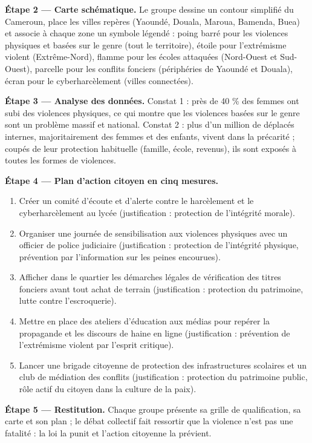 \documentclass[11pt]{article}
\begin{document}
\begin{exoresolu}
\textbf{Étape 2 — Carte schématique.} Le groupe dessine un contour simplifié du Cameroun, place les villes repères (Yaoundé, Douala, Maroua, Bamenda, Buea) et associe à chaque zone un symbole légendé : poing barré pour les violences physiques et basées sur le genre (tout le territoire), étoile pour l'extrémisme violent (Extrême-Nord), flamme pour les écoles attaquées (Nord-Ouest et Sud-Ouest), parcelle pour les conflits fonciers (périphéries de Yaoundé et Douala), écran pour le cyberharcèlement (villes connectées).\par
\textbf{Étape 3 — Analyse des données.} Constat 1 : près de 40 \% des femmes ont subi des violences physiques, ce qui montre que les violences basées sur le genre sont un problème massif et national. Constat 2 : plus d'un million de déplacés internes, majoritairement des femmes et des enfants, vivent dans la précarité ; coupés de leur protection habituelle (famille, école, revenus), ils sont exposés à toutes les formes de violences.\par
\textbf{Étape 4 — Plan d'action citoyen en cinq mesures.}\par
\begin{enumerate}
\item Créer un comité d'écoute et d'alerte contre le harcèlement et le cyberharcèlement au lycée (justification : protection de l'intégrité morale).
\item Organiser une journée de sensibilisation aux violences physiques avec un officier de police judiciaire (justification : protection de l'intégrité physique, prévention par l'information sur les peines encourues).
\item Afficher dans le quartier les démarches légales de vérification des titres fonciers avant tout achat de terrain (justification : protection du patrimoine, lutte contre l'escroquerie).
\item Mettre en place des ateliers d'éducation aux médias pour repérer la propagande et les discours de haine en ligne (justification : prévention de l'extrémisme violent par l'esprit critique).
\item Lancer une brigade citoyenne de protection des infrastructures scolaires et un club de médiation des conflits (justification : protection du patrimoine public, rôle actif du citoyen dans la culture de la paix).
\end{enumerate}
\textbf{Étape 5 — Restitution.} Chaque groupe présente sa grille de qualification, sa carte et son plan ; le débat collectif fait ressortir que la violence n'est pas une fatalité : la loi la punit et l'action citoyenne la prévient.
\end{exoresolu}
\end{document}
